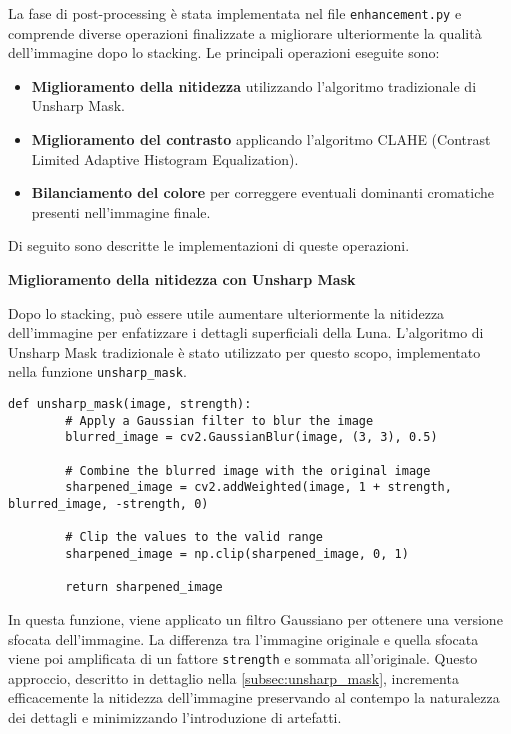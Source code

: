 La fase di post-processing è stata implementata nel file \texttt{enhancement.py} e comprende diverse operazioni finalizzate a migliorare ulteriormente la qualità dell'immagine dopo lo stacking. Le principali operazioni eseguite sono:

\begin{itemize}
    \item \textbf{Miglioramento della nitidezza} utilizzando l'algoritmo tradizionale di Unsharp Mask.
    \item \textbf{Miglioramento del contrasto} applicando l'algoritmo CLAHE (Contrast Limited Adaptive Histogram Equalization).
    \item \textbf{Bilanciamento del colore} per correggere eventuali dominanti cromatiche presenti nell'immagine finale.
\end{itemize}

Di seguito sono descritte le implementazioni di queste operazioni.

\textbf{Miglioramento della nitidezza con Unsharp Mask}

Dopo lo stacking, può essere utile aumentare ulteriormente la nitidezza dell'immagine per enfatizzare i dettagli superficiali della Luna. L'algoritmo di Unsharp Mask tradizionale è stato utilizzato per questo scopo, implementato nella funzione \texttt{unsharp\_mask}.

\begin{lstlisting}[label={lst:unsharp_mask}]
    def unsharp_mask(image, strength):
        # Apply a Gaussian filter to blur the image
        blurred_image = cv2.GaussianBlur(image, (3, 3), 0.5)

        # Combine the blurred image with the original image
        sharpened_image = cv2.addWeighted(image, 1 + strength, blurred_image, -strength, 0)

        # Clip the values to the valid range
        sharpened_image = np.clip(sharpened_image, 0, 1)

        return sharpened_image
\end{lstlisting}

In questa funzione, viene applicato un filtro Gaussiano per ottenere una versione sfocata dell'immagine. La differenza tra l'immagine originale e quella sfocata viene poi amplificata di un fattore \texttt{strength} e sommata all'originale. Questo approccio, descritto in dettaglio nella \cref{subsec:unsharp_mask}, incrementa efficacemente la nitidezza dell'immagine preservando al contempo la naturalezza dei dettagli e minimizzando l'introduzione di artefatti.

